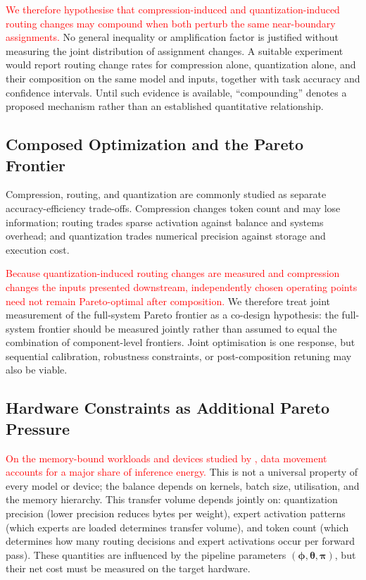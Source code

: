 \documentclass[10pt]{article}
\begin{document}
\textcolor{red}{We therefore hypothesise that compression-induced and
quantization-induced routing changes may compound when both perturb the same
near-boundary assignments.}  No general inequality or amplification factor is justified
without measuring the joint distribution of assignment changes.  A suitable experiment
would report routing change rates for compression alone, quantization alone, and their
composition on the same model and inputs, together with task accuracy and confidence
intervals.  Until such evidence is available, ``compounding'' denotes a proposed
mechanism rather than an established quantitative relationship.

\subsection{Composed Optimization and the Pareto Frontier}
\label{sec:pareto}
Compression, routing, and quantization are commonly studied as separate
accuracy-efficiency trade-offs.  Compression changes token count and may lose
information; routing trades sparse activation against balance and systems overhead;
and quantization trades numerical precision against storage and execution cost.

\textcolor{red}{Because quantization-induced routing changes are measured and compression
changes the inputs presented downstream, independently chosen operating points need not
remain Pareto-optimal after composition.} We therefore treat
joint measurement of the full-system Pareto frontier as a co-design hypothesis: the
full-system frontier should be measured jointly rather than assumed to equal the
combination of component-level frontiers.  Joint optimisation is one response, but sequential
calibration, robustness constraints, or post-composition retuning may also be viable.

\subsection{Hardware Constraints as Additional Pareto Pressure}

\textcolor{red}{On the memory-bound workloads and devices studied by
\citet{chung2026joulesgodiagnosinginference}, data movement accounts for a major share
of inference energy.}  This is not a universal property of every model or device; the
balance depends on kernels, batch size, utilisation, and the memory hierarchy.
This transfer volume depends jointly on:
quantization precision (lower precision reduces bytes per
weight),
expert activation patterns (which experts are loaded determines
transfer volume),
and token count (which determines how many routing decisions
and expert activations occur per forward pass).
These quantities are influenced by the pipeline parameters
$(\boldsymbol{\phi}, \boldsymbol{\theta}, \boldsymbol{\pi})$, but their net cost must be
measured on the target hardware.
\end{document}
